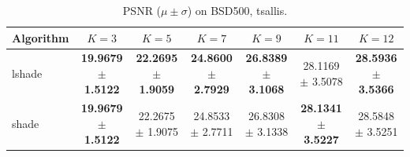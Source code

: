 \begin{table}[htbp]
\centering
\caption{PSNR ($\mu \pm \sigma$) on BSD500, tsallis.}
\label{tab:exp1-tsallis-psnr}
\begin{tabular}{lcccccc}
\toprule
Algorithm & $K=3$ & $K=5$ & $K=7$ & $K=9$ & $K=11$ & $K=12$ \\
\midrule
lshade & \textbf{19.9679 $\pm$ 1.5122} & \textbf{22.2695 $\pm$ 1.9059} & \textbf{24.8600 $\pm$ 2.7929} & \textbf{26.8389 $\pm$ 3.1068} & 28.1169 $\pm$ 3.5078 & \textbf{28.5936 $\pm$ 3.5366} \\
shade & \textbf{19.9679 $\pm$ 1.5122} & 22.2675 $\pm$ 1.9075 & 24.8533 $\pm$ 2.7711 & 26.8308 $\pm$ 3.1338 & \textbf{28.1341 $\pm$ 3.5227} & 28.5848 $\pm$ 3.5251 \\
\bottomrule
\end{tabular}
\end{table}
